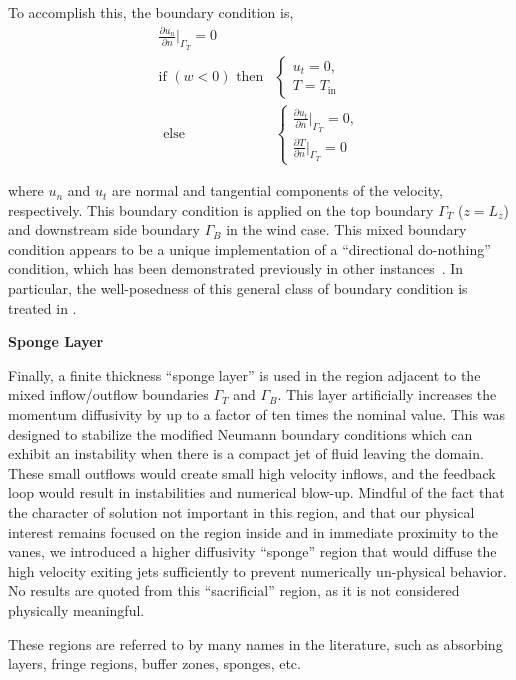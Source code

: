 To accomplish this, the boundary condition is,
\begin{align}
  \frac{\partial u_n}{\partial n}\bigg|_{\Gamma_T} = 0 \\
  \text{if } (w<0) \text{ then}& \begin{cases}
    u_t = 0,\\
    T = T_{\text{in}}
  \end{cases} \\
  \text{ else}& \begin{cases}
    \frac{\partial u_t}{\partial n}\bigg|_{\Gamma_T} = 0, \\  
    \frac{\partial T}{\partial n}\bigg|_{\Gamma_T} = 0
  \end{cases}
\end{align}

where $u_n$ and $u_t$ are normal and tangential components of the velocity, 
respectively. This boundary condition is applied on the top boundary
$\Gamma_T$ ($z=L_z$) and downstream side boundary  $\Gamma_B$ in the
wind case. This mixed boundary condition appears to be a unique
implementation of a ``directional do-nothing'' condition, which has been
demonstrated previously in other
instances~\cite{braack2014directional,feistauer2006non}. In particular,
the well-posedness of this general class of boundary condition is
treated in \cite{bruneau1996new}.  

\textbf{Sponge Layer} 

Finally, a finite thickness ``sponge layer'' is used in the region adjacent 
to the mixed inflow/outflow boundaries $\Gamma_T$ and $\Gamma_B$.
This layer artificially increases the momentum diffusivity by
up to a factor of ten times the nominal value. This was designed to stabilize
the modified Neumann boundary conditions which can exhibit an instability
when there is a compact jet of fluid leaving the domain. 
These small outflows would create small high velocity inflows, and the
feedback loop would result in instabilities and numerical
blow-up. Mindful of the fact that the character of solution not
important in this region, and that our physical interest remains focused
on the region inside and in immediate proximity to the vanes, we
introduced a higher diffusivity ``sponge'' region that would diffuse the
high velocity exiting jets sufficiently to prevent numerically
un-physical behavior. No results are quoted from this ``sacrificial''
region, as it is not considered physically meaningful.

These regions are referred to by many names in the
literature\cite{doi:10.1146/annurev.fluid.36.050802.121930}, such as
absorbing layers, fringe regions, buffer zones, sponges,
etc.

